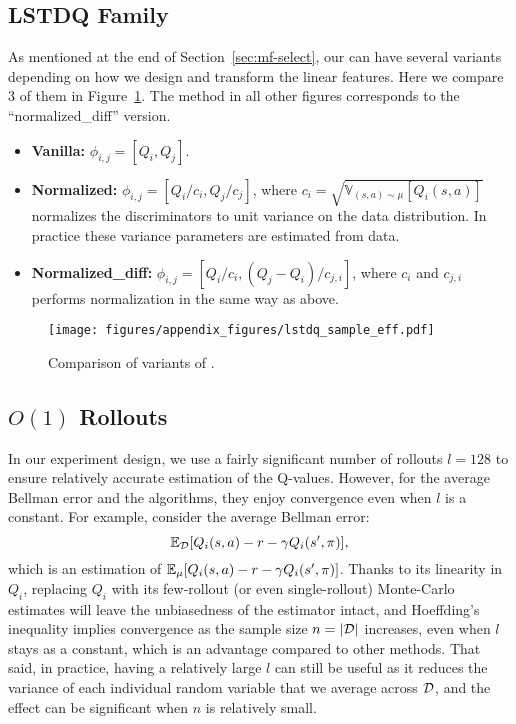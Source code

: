 \subsection{LSTDQ Family} \label{app:lstd}
As mentioned at the end of Section~\ref{sec:mf-select}, our \lstd can have several variants depending on how we design and transform the linear features. Here we compare 3 of them in Figure~\ref{fig:lstdq_sample_eff}. The \lstd method in all other figures corresponds to the ``normalized\_diff'' version. 
\begin{itemize}
    \item \textbf{Vanilla:} $\phi_{i,j} = [Q_i, Q_j]$.
    \item \textbf{Normalized:} $\phi_{i,j} = [Q_i/c_i, Q_j/c_j]$, where $c_i = \sqrt{\mathbb{V}_{(s,a)\sim \mu}[Q_i(s,a)]}$ normalizes the discriminators to unit variance on the data distribution. In practice these variance parameters are estimated from data.
    \item \textbf{Normalized\_diff:} $\phi_{i,j} = [Q_i/c_i, (Q_j-Q_i)/c_{j,i}]$, where $c_i$ and $c_{j,i}$ performs normalization in the same way as above. 
\end{itemize}



\clearpage

\begin{figure}
    \centering
    \texttt{[image: figures/appendix\_figures/lstdq\_sample\_eff.pdf]}
    \caption{Comparison of variants of \lstd.}
    \label{fig:lstdq_sample_eff}
\end{figure}

\clearpage 

\subsection{$O(1)$ Rollouts} 
In our experiment design, we use a fairly significant number of rollouts $l=128$ to ensure relatively accurate estimation of the Q-values. However, for the average Bellman error and the \lstd algorithms, they enjoy convergence even when $l$ is a constant. For example, consider the average Bellman error:
$$
\mathbb{E}_{\mathcal{D}}[Q_i(s,a) - r - \gamma Q_i(s',\pi)],
$$
which is an estimation of 
$\mathbb{E}_{\mu}[Q_i(s,a) - r - \gamma Q_i(s',\pi)]$. 
Thanks to its linearity in $Q_i$, replacing $Q_i$ with its few-rollout (or even single-rollout) Monte-Carlo estimates will leave the unbiasedness of the estimator intact, and Hoeffding's inequality implies convergence as the sample size $n=|\mathcal{D}|$ increases, even when $l$ stays as a constant, which is an advantage compared to other methods. That said, in practice, having a relatively large $l$ can still  be useful as it reduces the variance of each individual random variable that we average across $\mathcal{D}$, and the effect can be significant when $n$ is relatively small. 

